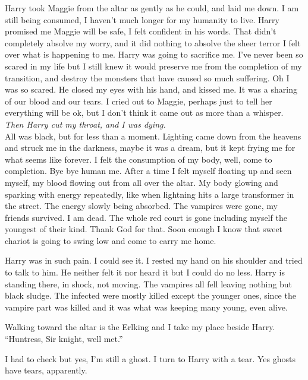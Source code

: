 Harry took Maggie from the altar as gently as he could, and laid me down. I am still being consumed, I haven't much longer for my humanity to live. Harry promised me Maggie will be safe, I felt confident in his words. That didn't completely absolve my worry, and it did nothing to absolve the sheer terror I felt over what is happening to me. Harry was going to sacrifice me. I've never been so scared in my life but I still knew it would preserve me from the completion of my transition, and destroy the monsters that have caused so much suffering. Oh I was so scared. He closed my eyes with his hand, and kissed me. It was a sharing of our blood and our tears. I cried out to Maggie, perhaps just to tell her everything will be ok, but I don't think it came out as more than a whisper.\\

\textit{Then Harry cut my throat, and I was dying.}\\

All was black, but for less than a moment. Lighting came down from the heavens and struck me in the darkness, maybe it was a dream, but it kept frying me for what seems like forever. I felt the consumption of my body, well, come to completion. Bye bye human me. After a time I felt myself floating up and seen myself, my blood flowing out from all over the altar. My body glowing and sparking with energy repeatedly, like when lightning hits a large transformer in the street. The energy slowly being absorbed. The vampires were gone, my friends survived. I am dead. The whole red court is gone including myself the youngest of their kind. Thank God for that. Soon enough I know that sweet chariot is going to swing low and come to carry me home.

Harry was in such pain. I could see it. I rested my hand on his shoulder and tried to talk to him. He neither felt it nor heard it but I could do no less. Harry is standing there, in shock, not moving. The vampires all fell leaving nothing but black sludge. The infected were mostly killed except the younger ones, since the vampire part was killed and it was what was keeping many young, even alive. 

Walking toward the altar is the Erlking and I take my place beside Harry.\\

	``Huntress, Sir knight, well met.''

I had to check but yes, I'm still a ghost. I turn to Harry with a tear. Yes ghosts have tears, apparently.

